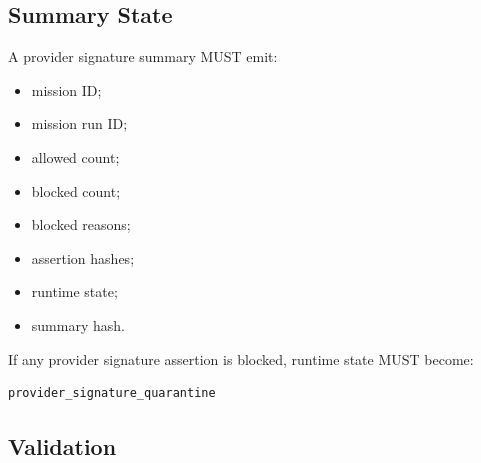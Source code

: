 \subsection{Summary State}

A provider signature summary MUST emit:

\begin{itemize}
  \item mission ID;
  \item mission run ID;
  \item allowed count;
  \item blocked count;
  \item blocked reasons;
  \item assertion hashes;
  \item runtime state;
  \item summary hash.
\end{itemize}

If any provider signature assertion is blocked, runtime state MUST become:

\begin{verbatim}
provider_signature_quarantine
\end{verbatim}

\subsection{Validation}

